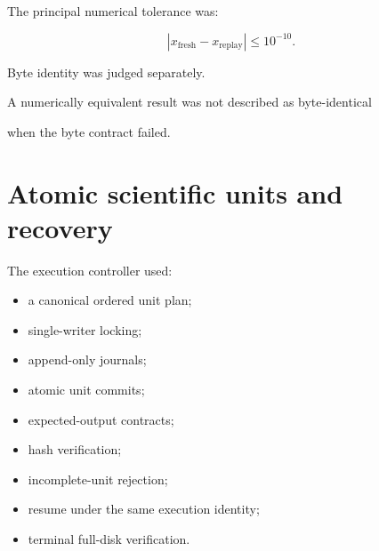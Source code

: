\documentclass[11pt,a4paper,oneside]{report}
\begin{document}
The principal numerical tolerance was:



\begin{equation}
\left|
x_{\mathrm{fresh}}
-
x_{\mathrm{replay}}
\right|
\leq
10^{-10}.
\end{equation}



Byte identity was judged separately.



A numerically equivalent result was not described as byte-identical

when the byte contract failed.





\section{Atomic scientific units and recovery}



The execution controller used:



\begin{itemize}



\item

a canonical ordered unit plan;



\item

single-writer locking;



\item

append-only journals;



\item

atomic unit commits;



\item

expected-output contracts;



\item

hash verification;



\item

incomplete-unit rejection;



\item

resume under the same execution identity;



\item

terminal full-disk verification.



\end{itemize}
\end{document}
